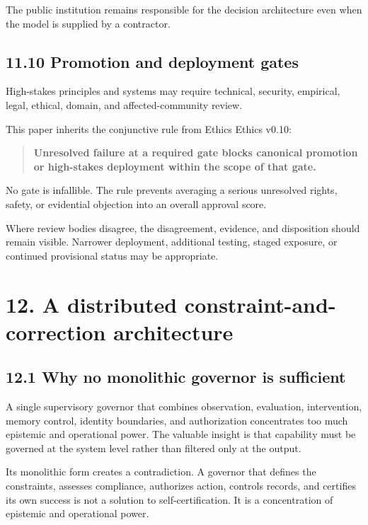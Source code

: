 \documentclass[
  11pt,
]{article}
\begin{document}
The public institution remains responsible for the decision architecture
even when the model is supplied by a contractor.

\subsection{11.10 Promotion and deployment
gates}\label{promotion-and-deployment-gates}

High-stakes principles and systems may require technical, security,
empirical, legal, ethical, domain, and affected-community review.

This paper inherits the conjunctive rule from Ethics Ethics v0.10:

\begin{quote}
\textbf{Unresolved failure at a required gate blocks canonical promotion
or high-stakes deployment within the scope of that gate.}
\end{quote}

No gate is infallible. The rule prevents averaging a serious unresolved
rights, safety, or evidential objection into an overall approval score.

Where review bodies disagree, the disagreement, evidence, and
disposition should remain visible. Narrower deployment, additional
testing, staged exposure, or continued provisional status may be
appropriate.

\section{12. A distributed constraint-and-correction
architecture}\label{a-distributed-constraint-and-correction-architecture}

\subsection{12.1 Why no monolithic governor is
sufficient}\label{why-no-monolithic-governor-is-sufficient}

A single supervisory governor that combines observation, evaluation,
intervention, memory control, identity boundaries, and authorization
concentrates too much epistemic and operational power. The valuable
insight is that capability must be governed at the system level rather
than filtered only at the output.

Its monolithic form creates a contradiction. A governor that defines the
constraints, assesses compliance, authorizes action, controls records,
and certifies its own success is not a solution to self-certification.
It is a concentration of epistemic and operational power.
\end{document}
